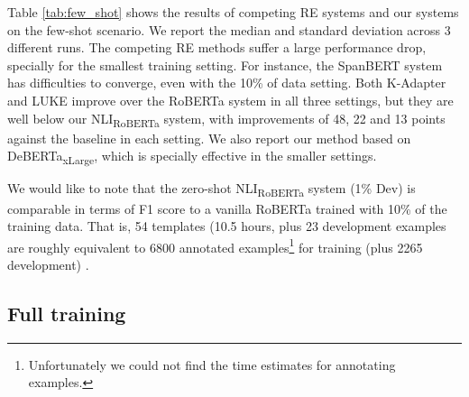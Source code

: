 \documentclass[11pt]{article}
\begin{document}
Table \ref{tab:few_shot} shows the results of competing RE systems and our systems on the few-shot scenario. We report the median and standard deviation across 3 different runs. 
The competing RE methods suffer a large performance drop, specially for the smallest training setting. For instance, the SpanBERT system \cite{joshi-etal-2020-spanbert} has difficulties to converge, even with the 10\% of data setting. Both K-Adapter \cite{wang2020kadapter} and LUKE \cite{yamada-etal-2020-luke} improve over the RoBERTa system \cite{wang2020kadapter} in all three settings, but they are well below our NLI\textsubscript{RoBERTa} system, with improvements of 48, 22 and 13 points against the baseline in each setting. We also report our method based on DeBERTa\textsubscript{xLarge}, which is specially effective in the smaller settings. 

We would like to note that the zero-shot NLI\textsubscript{RoBERTa} system (1\% Dev) is comparable in terms of F1 score to a vanilla RoBERTa trained with 10\% of the training data. That is, 54 templates (10.5 hours, plus 23 development examples are roughly equivalent to 6800 annotated examples\footnote{Unfortunately we could not find the time estimates for annotating examples.} for training (plus 2265 development) .

\subsection{Full training}

\begin{table}
    \centering
    \caption{Full training results (TACRED). Top four rows for third-party RE systems as reported by authors.}
    \label{tab:full_ft}
\end{table}
\end{document}
